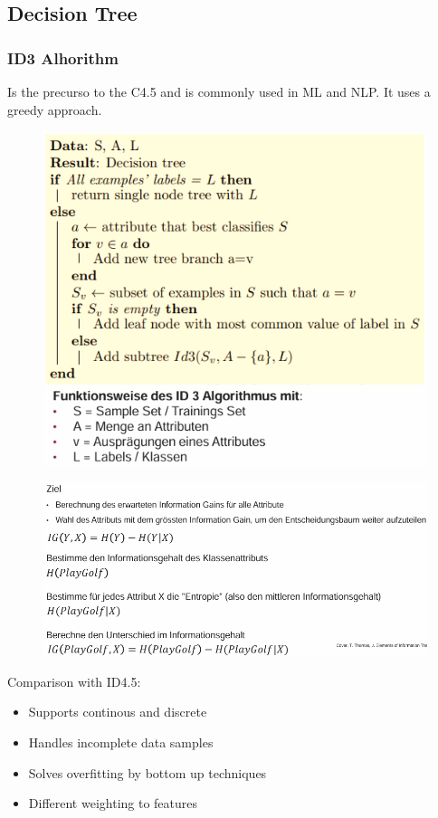 \documentclass[../Main.tex]{subfiles}
\begin{document}
\subsection{Decision Tree}
\subsubsection{ID3 Alhorithm}
Is the precurso to the C4.5 and is commonly used in ML and NLP.
It uses a greedy approach.
\begin{figure}[H]
    \centering
    \includegraphics[width=0.75\linewidth]{Images/datan/id3-algorithm.png}
\end{figure}
\begin{figure}[H]
    \centering
    \includegraphics[width=0.75\linewidth]{Images/datan/tree-attribute-calc.png}
\end{figure}
Comparison with ID4.5:
\begin{itemize}
    \item Supports continous and discrete
    \item Handles incomplete data samples
    \item Solves overfitting by bottom up techniques
    \item Different weighting to features
\end{itemize}
\end{document}

